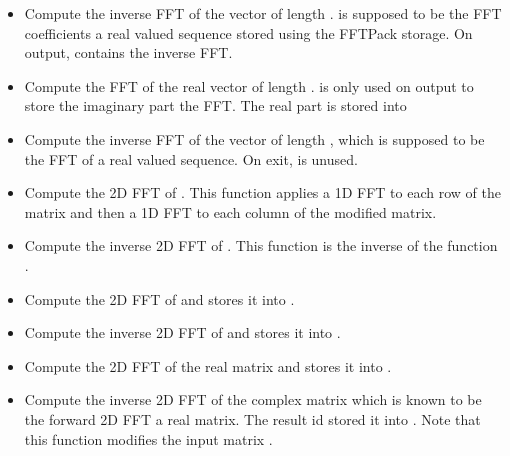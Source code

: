 \begin{itemize}
\item {}
  \sshortdescribe Compute the inverse FFT of the vector  of length
  .  is supposed to be the FFT coefficients a real valued
  sequence stored using the FFTPack storage. On output,  contains
  the inverse FFT.

\item {}
  \sshortdescribe Compute the FFT of the real vector  of length .
   is only used on output to store the imaginary part the FFT. The
  real part is stored into 

\item {}
  \sshortdescribe Compute the inverse FFT of the vector  of
  length , which is supposed to be the FFT of a real valued
  sequence. On exit,  is unused.
\item {}
  \sshortdescribe Compute the 2D FFT of . This function applies a 1D
  FFT to each row of the matrix and then a 1D FFT to each column of the modified
  matrix.
\item {}
  \sshortdescribe Compute the inverse 2D FFT of . This function is
  the inverse of the function .
\item {}
  \sshortdescribe Compute the 2D FFT of  and stores it into .
\item {}
  \sshortdescribe Compute the inverse 2D FFT of  and stores it into .
\item {}
  \sshortdescribe Compute the 2D FFT of the real matrix  and stores it into .
\item {}
  \sshortdescribe Compute the inverse 2D FFT of the complex matrix 
  which is known to be the forward 2D FFT a real matrix. The result id stored it
  into . Note that this function modifies the input matrix .
\end{itemize}


